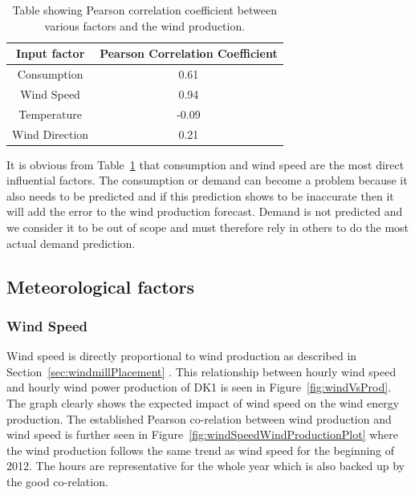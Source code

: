 \begin{table}[H]
\centering  %
\begin{tabular}{c c} %
Input factor & Pearson Correlation Coefficient \\ [0.5ex] %
\hline                  %
Consumption & 0.61 \\ %
Wind Speed & 0.94 \\
Temperature & -0.09 \\
Wind Direction & 0.21 \\ [1ex] %
\hline %
\end{tabular}
\caption{Table showing Pearson correlation coefficient between various factors and the wind production.} %
\label{table:pearsonCoeficientWindProduction} %
\end{table}

It is obvious from Table~\ref{table:pearsonCoeficientWindProduction} that consumption and wind speed are the most direct influential factors. The consumption or demand can become a problem because it also needs to be predicted and if this prediction shows to be inaccurate then it will add the error to the wind production forecast. Demand is not predicted and we consider it to be out of scope and must therefore rely in others to do the most actual demand prediction.

\subsection{Meteorological factors}

\subsubsection{Wind Speed}
Wind speed is directly proportional to wind production as described in Section~\ref{sec:windmillPlacement} . This relationship between hourly wind speed and hourly wind power production of DK1 is seen in Figure~\ref{fig:windVsProd}. The graph clearly shows the expected impact of wind speed on the wind energy production. The established Pearson co-relation between wind production and wind speed is further seen in Figure~\ref{fig:windSpeedWindProductionPlot} where the wind production follows the same trend as wind speed for the beginning of 2012. The hours are representative for the whole year  which is also backed up by the good co-relation. 

